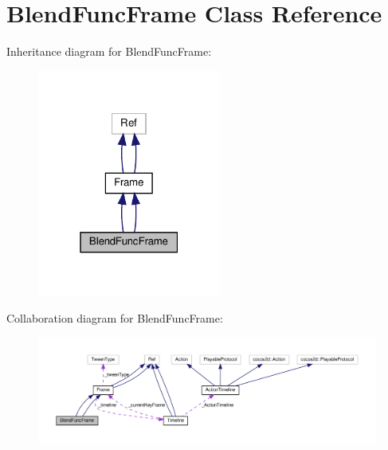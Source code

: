 \hypertarget{classBlendFuncFrame}{}\section{Blend\+Func\+Frame Class Reference}
\label{classBlendFuncFrame}


Inheritance diagram for Blend\+Func\+Frame\+:
\nopagebreak
\begin{figure}[H]
\begin{center}
\leavevmode
\includegraphics[width=171pt]{classBlendFuncFrame__inherit__graph}
\end{center}
\end{figure}


Collaboration diagram for Blend\+Func\+Frame\+:
\nopagebreak
\begin{figure}[H]
\begin{center}
\leavevmode
\includegraphics[width=350pt]{classBlendFuncFrame__coll__graph}
\end{center}
\end{figure}
